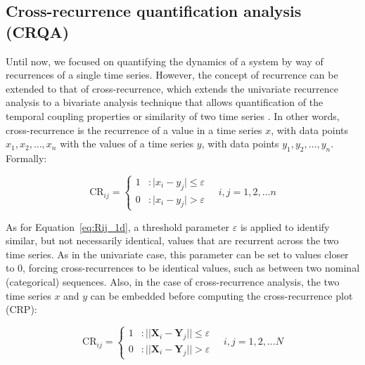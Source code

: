\subsection{Cross-recurrence quantification analysis (CRQA)}
\label{sec:crqa}

Until now, we focused on quantifying the dynamics of a system by way of recurrences of a single time series. However, the concept of recurrence can be extended to that of cross-recurrence, which extends the univariate recurrence analysis to a bivariate analysis technique that allows quantification of the temporal coupling properties or similarity of two time series \citep{zbilut1998detecting, marwan2007recurrence}. In other words, cross-recurrence is the recurrence of a value in a time series $x$, with data points $x_1, x_2, \ldots ,x_n$ with the values of a time series $y$, with data points $y_1, y_2, \ldots ,y_n$. Formally:

\begin{equation}
     \mathrm{CR}_{ij} = \left\{
  \begin{array}{lr}
    1 & : \vert x_i - y_j \vert \leq \varepsilon \\
    0 & : \vert x_i - y_j \vert > \varepsilon
  \end{array}
\right.
\quad
i,j = 1,2, \ldots n
\end{equation}

As for Equation~\ref{eq:Rij_1d}, a threshold parameter $\varepsilon$ is applied to identify similar, but not necessarily identical, values that are recurrent across the two time series. As in the univariate case, this parameter can be set to values closer to 0, forcing cross-recurrences to be identical values, such as between two nominal (categorical) sequences. Also, in the case of cross-recurrence analysis, the two time series $x$ and $y$ can be embedded before computing the cross-recurrence plot (CRP):

\begin{equation}
    \mathrm{CR}_{ij} = \left\{
  \begin{array}{lr}
    1 & : \vert\vert \mathbf{X}_i - \mathbf{Y}_j \vert\vert \leq \varepsilon \\
    0 & : \vert\vert \mathbf{X}_i - \mathbf{Y}_j \vert\vert > \varepsilon
  \end{array}
\right.
\quad
i,j = 1,2, \ldots N
\end{equation}

